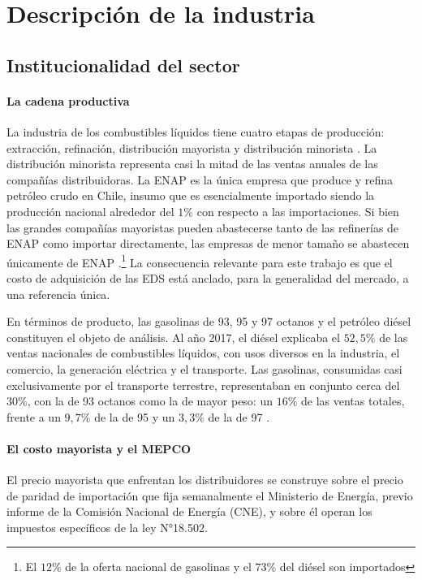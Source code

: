 \section{Descripción de la industria}

\subsection{Institucionalidad del sector}

\paragraph{La cadena productiva} La industria de los combustibles líquidos tiene cuatro etapas de producción: extracción, refinación, distribución mayorista y distribución minorista \parencite{FNE2025informe}. La distribución minorista representa casi la mitad de las ventas anuales de las compañías distribuidoras. La ENAP es la única empresa que produce y refina petróleo crudo en Chile, insumo que es esencialmente importado siendo la producción nacional alrededor del $1\%$ con respecto a las importaciones. Si bien las grandes compañías mayoristas pueden abastecerse tanto de las refinerías de ENAP como importar directamente, las empresas de menor tamaño se abastecen únicamente de ENAP \parencite{FNE2025informe}.\footnote{El $12\%$ de la oferta nacional de gasolinas y el $73\%$ del diésel son importados} La consecuencia relevante para este trabajo es que el costo de adquisición de las EDS está anclado, para la generalidad del mercado, a una referencia única.

En términos de producto, las gasolinas de 93, 95 y 97 octanos y el petróleo diésel constituyen el objeto de análisis. Al año 2017, el diésel explicaba el $52{,}5\%$ de las ventas nacionales de combustibles líquidos, con usos diversos en la industria, el comercio, la generación eléctrica y el transporte. Las gasolinas, consumidas casi exclusivamente por el transporte terrestre, representaban en conjunto cerca del $30\%$, con la de 93 octanos como la de mayor peso: un $16\%$ de las ventas totales, frente a un $9{,}7\%$ de la de 95 y un $3{,}3\%$ de la de 97 \parencite{FNE2025informe}.

\paragraph{El costo mayorista y el MEPCO} El precio mayorista que enfrentan los distribuidores se construye sobre el precio de paridad de importación que fija semanalmente el Ministerio de Energía, previo informe de la Comisión Nacional de Energía (CNE), y sobre él operan los impuestos específicos de la ley N°18.502.

